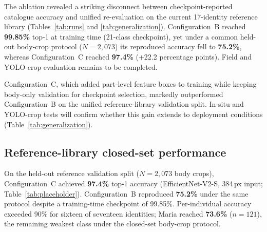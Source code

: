 \documentclass[preprint,12pt,3p,times]{elsarticle}
\begin{document}
The ablation revealed a striking disconnect between checkpoint-reported catalogue accuracy and unified re-evaluation on the current 17-identity reference library (Tables~\ref{tab:runs} and \ref{tab:generalization}). Configuration~B reached \textbf{99.85\%} top-1 at training time (21-class checkpoint), yet under a common held-out body-crop protocol ($N{=}2{,}073$) its reproduced accuracy fell to \textbf{75.2\%}, whereas Configuration~C reached \textbf{97.4\%} (+22.2 percentage points). Field and YOLO-crop evaluation remains to be completed.

Configuration~C, which added part-level feature boxes to training while keeping body-only validation for checkpoint selection, markedly outperformed Configuration~B on the unified reference-library validation split. In-situ and YOLO-crop tests will confirm whether this gain extends to deployment conditions (Table~\ref{tab:generalization}).

\subsection{Reference-library closed-set performance}

On the held-out reference validation split ($N{=}2{,}073$ body crops), Configuration~C achieved \textbf{97.4\%} top-1 accuracy (EfficientNet-V2-S, 384\,px input; Table~\ref{tab:placeholder}). Configuration~B reproduced \textbf{75.2\%} under the same protocol despite a training-time checkpoint of 99.85\%. Per-individual accuracy exceeded 90\% for sixteen of seventeen identities; Maria reached \textbf{73.6\%} ($n{=}121$), the remaining weakest class under the closed-set body-crop protocol.
\end{document}
